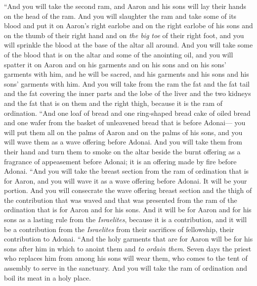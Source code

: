 \begin{biblechapter}
\verse “And you will take the second ram, and Aaron and his sons will lay their hands on the head of the ram.
\verse And you will slaughter the ram and take some of its blood and put it on Aaron’s right earlobe and on the right earlobe of his sons and on the thumb of their right hand and on \textit{the big toe} of their right foot, and you will sprinkle the blood at the base of the altar all around.
\verse And you will take some of the blood that is on the altar and some of the anointing oil, and you will spatter it on Aaron and on his garments and on his sons and on his sons’ garments with him, and he will be sacred, and his garments and his sons and his sons’ garments with him.
\verse And you will take from the ram the fat and the fat tail and the fat covering the inner parts and the lobe of the liver and the two kidneys and the fat that is on them and the right thigh, because it is the ram of ordination.
\verse “And one loaf of bread and one ring-shaped bread cake of oiled bread and one wafer from the basket of unleavened bread that is before Adonai—
\verse you will put them all on the palms of Aaron and on the palms of his sons, and you will wave them as a wave offering before Adonai.
\verse And you will take them from their hand and turn them to smoke on the altar beside the burnt offering as a fragrance of appeasement before Adonai; it is an offering made by fire before Adonai.
\verse “And you will take the breast section from the ram of ordination that is for Aaron, and you will wave it as a wave offering before Adonai. It will be your portion.
\verse And you will consecrate the wave offering breast section and the thigh of the contribution that was waved and that was presented from the ram of the ordination that is for Aaron and for his sons.
\verse And it will be for Aaron and for his sons as a lasting rule from the \textit{Israelites}, because it is a contribution, and it will be a contribution from the \textit{Israelites} from their sacrifices of fellowship, their contribution to Adonai.
\verse “And the holy garments that are for Aaron will be for his sons after him in which to anoint them and \textit{to ordain them}.
\verse Seven days the priest who replaces him from among his sons will wear them, who comes to the tent of assembly to serve in the sanctuary.
\verse And you will take the ram of ordination and boil its meat in a holy place.

\end{biblechapter}
